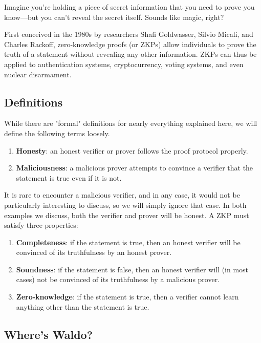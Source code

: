 \documentclass{article}
\begin{document}
\begin{multicols}{2}
Imagine you're holding a piece of secret information that you need to prove you know---but you can't reveal the secret itself. Sounds like magic, right?

First conceived in the 1980s by researchers Shafi Goldwasser, Silvio Micali, and Charles Rackoff, zero-knowledge proofs (or ZKPs) allow individuals to prove the truth of a statement without revealing any other information. ZKPs can thus be applied to authentication systems, cryptocurrency, voting systems, and even nuclear disarmament.

\subsection*{Definitions}

While there are "formal" definitions for nearly everything explained here, we will define the following terms loosely.

\begin{enumerate}
    \item \textbf{Honesty}: an honest verifier or prover follows the proof protocol properly.
    \item \textbf{Maliciousness}: a malicious prover attempts to convince a verifier that the statement is true even if it is not.
\end{enumerate}

It is rare to encounter a malicious verifier, and in any case, it would not be particularly interesting to discuss, so we will simply ignore that case. In both examples we discuss, both the verifier and prover will be honest. A ZKP must satisfy three properties:

\begin{enumerate}
    \item \textbf{Completeness}: if the statement is true, then an honest verifier will be convinced of its truthfulness by an honest prover.
    \item \textbf{Soundness}: if the statement is false, then an honest verifier will (in most cases) not be convinced of its truthfulness by a malicious prover.
    \item \textbf{Zero-knowledge}: if the statement is true, then a verifier cannot learn anything other than the statement is true.
\end{enumerate}

\subsection*{Where's Waldo?}


\end{multicols}
\end{document}

